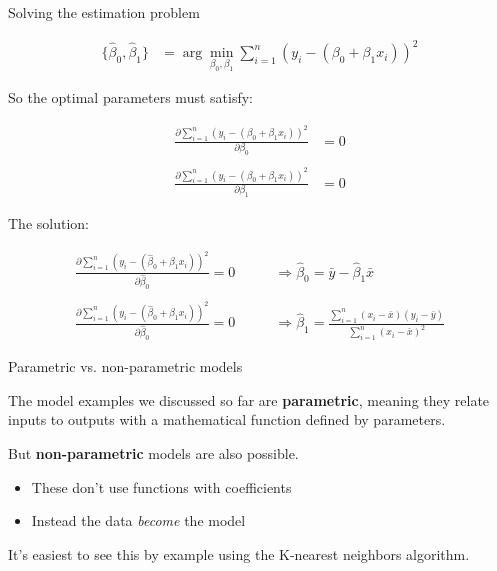\documentclass[aspectratio=169, handout]{beamer}
\begin{document}
\begin{frame}{Solving the estimation problem}

\begin{align*}
\{\hat{\beta}_0, \hat{\beta}_1\} &= \arg \min_{\beta_0,\beta_1} \sum_{i=1}^n (y_i - (\beta_0 + \beta_1 x_i))^2
\end{align*}

So the optimal parameters must satisfy:

\begin{align*}
\frac{\partial \sum_{i=1}^n (y_i - (\beta_0 + \beta_1 x_i))^2}{\partial \beta_0} &= 0\\\\
\frac{\partial  \sum_{i=1}^n(y_i - (\beta_0 + \beta_1 x_i))^2}{\partial \beta_1} &= 0
\end{align*}
\end{frame}

\begin{frame}{The solution: }

\begin{align*}
\frac{\partial  \sum_{i=1}^n(y_i - (\hat{\beta}_0 + \hat{\beta}_1 x_i))^2}{\partial \hat{\beta}_0} = 0 \quad\quad &\Rightarrow \hat{\beta}_0  =\bar{y} - \hat{\beta}_1\bar{x}\\\\
\frac{\partial   \sum_{i=1}^n(y_i - (\hat{\beta}_0 + \hat{\beta}_1 x_i))^2}{\partial \hat{\beta}_0} = 0 \quad\quad &\Rightarrow 
\hat{\beta}_1 = \frac{ \sum_{i=1}^n(x_i-\bar{x})(y_i-\bar{y})}{\sum_{i=1}^n (x_i-\bar{x})^2}
\end{align*}

\end{frame}

\begin{frame}{Parametric vs. non-parametric models}

The model examples we discussed so far are \textbf{parametric}, meaning they relate inputs to outputs with a mathematical function defined by parameters.  

\vspace{5mm}

But \textbf{non-parametric} models are also possible.  
\begin{itemize}
\item These don't use functions with coefficients
\item Instead the data \textit{become} the model
\end{itemize}

\vspace{5mm}

It's easiest to see this by example using the K-nearest neighbors algorithm.

\end{frame}
\end{document}
